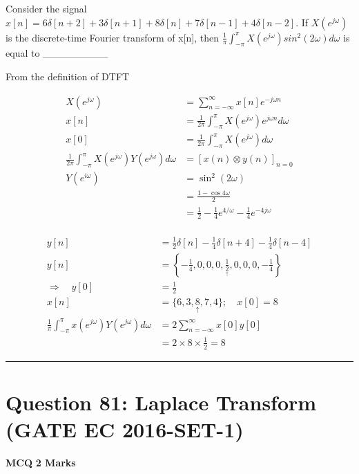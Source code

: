 \documentclass[11pt,a4paper]{article}
\begin{document}
\noindent Consider the signal 
$x[n]=6\delta [n+2]+3\delta [n+1]+8\delta [n]+7\delta [n-1]+4\delta [n-2]$.
If $X(e^{j\omega })$ is the discrete-time Fourier transform of x[n],
 then  $\frac{1}{\pi }\int_{-\pi }^{\pi }X(e^{j\omega })sin^{2}(2\omega )d\omega$ is equal to \_\_\_\_\_\_\_\_\_


\begin{tcolorbox}[solbox, title=Detailed Solution -- Question 80]
From the definition of DTFT

\[
\begin{aligned} X\left(e^{j \omega}\right) &=\sum_{n=-\infty}^{\infty} x[n] e^{-j \omega n} \\ x[n] &=\frac{1}{2 \pi} \int_{-\pi}^{\pi} X\left(e^{j \omega}\right) e^{j \omega n} d \omega \\ x[0] &=\frac{1}{2 \pi} \int_{-\pi}^{\pi} X\left(e^{j \omega}\right) d \omega \\ \frac{1}{2 \pi} \int_{-\pi}^{\pi} X\left(e^{j \omega}\right) Y\left(e^{j \omega}\right) d\omega &=[x(n) \otimes y(n)]_{n=0} \\ Y\left(e^{i \omega}\right) &=\sin ^{2}(2 \omega) \\ &=\frac{1-\cos 4 \omega}{2} \\ &=\frac{1}{2}-\frac{1}{4} e^{4 / \omega}-\frac{1}{4} e^{-4 j \omega}\\ \end{aligned}
\]

\[
\begin{aligned} y[n]&=\frac{1}{2} \delta[n]-\frac{1}{4} \delta[n+4]-\frac{1}{4} \delta[n-4] \\ y[n]&=\left\{-\frac{1}{4}, 0,0,0, \frac{1}{\underset{\uparrow}{2}}, 0,0,0,-\frac{1}{4}\right\} \\ \Rightarrow \quad y[0]&=\frac{1}{2} \\ x[n]&=\{6,3,\underset{\uparrow}{8},7,4\} ; \quad x[0]=8\\ \frac{1}{\pi} \int_{-\pi}^{\pi} x\left(e^{j \omega}\right) Y\left(e^{j \omega}\right) d \omega &=2 \sum_{n=-\infty}^{\infty} x[0] y[0] \\ &=2 \times 8 \times \frac{1}{2}=8 \end{aligned}
\]
\end{tcolorbox}

\vspace{1.5em}
\hrule
\vspace{1.5em}

\section*{Question 81: Laplace Transform (GATE EC 2016-SET-1)}
\noindent \textbf{\color{primary}MCQ} \hfill \textbf{\color{secondary}2 Marks}
\end{document}
